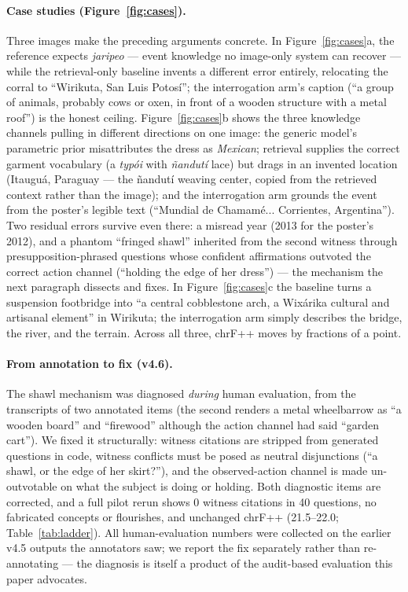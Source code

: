 \documentclass[11pt]{article}
\begin{document}
\paragraph{Case studies (Figure~\ref{fig:cases}).}
Three images make the preceding arguments concrete. In
Figure~\ref{fig:cases}a, the reference expects \emph{jaripeo} --- event
knowledge no image-only system can recover --- while the retrieval-only
baseline invents a different error entirely, relocating the corral to
``Wirikuta, San Luis Potosí''; the interrogation arm's caption (``a group of
animals, probably cows or oxen, in front of a wooden structure with a metal
roof'') is the honest ceiling. Figure~\ref{fig:cases}b shows the three
knowledge channels pulling in different directions on one image: the
generic model's parametric prior misattributes the dress as \emph{Mexican};
retrieval supplies the correct garment vocabulary (a \emph{typói} with
\emph{ñandutí} lace) but drags in an invented location (Itauguá, Paraguay
--- the ñandutí weaving center, copied from the retrieved context rather
than the image); and the interrogation arm grounds the event from the
poster's legible text (``Mundial de Chamamé... Corrientes, Argentina'').
Two residual errors survive even there: a misread year (2013 for the
poster's 2012), and a phantom ``fringed shawl'' inherited from the second
witness through presupposition-phrased questions whose confident
affirmations outvoted the correct action channel (``holding the edge of
her dress'') --- the mechanism the next paragraph dissects and fixes.
In Figure~\ref{fig:cases}c the
baseline turns a suspension footbridge into ``a central cobblestone arch, a
Wixárika cultural and artisanal element'' in Wirikuta; the interrogation
arm simply describes the bridge, the river, and the terrain. Across all
three, chrF++ moves by fractions of a point.

\paragraph{From annotation to fix (v4.6).}
The shawl mechanism was diagnosed \emph{during} human evaluation, from the
transcripts of two annotated items (the second renders a metal wheelbarrow
as ``a wooden board'' and ``firewood'' although the action channel had said
``garden cart''). We fixed it structurally: witness citations are stripped
from generated questions in code, witness conflicts must be posed as
neutral disjunctions (``a shawl, or the edge of her skirt?''), and the
observed-action channel is made un-outvotable on what the subject is doing
or holding. Both diagnostic items are corrected, and a full pilot rerun
shows 0 witness citations in 40 questions, no fabricated concepts or
flourishes, and unchanged chrF++ (21.5--22.0; Table~\ref{tab:ladder}). All
human-evaluation numbers were collected on the earlier v4.5 outputs the
annotators saw; we report the fix separately rather than re-annotating ---
the diagnosis is itself a product of the audit-based evaluation this paper
advocates.
\end{document}
